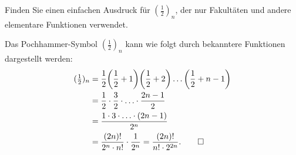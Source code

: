 Finden Sie einen einfachen Ausdruck für $(\frac12)_n$, der nur
Fakultäten und andere elementare Funktionen verwendet.

\begin{loesung}
Das Pochhammer-Symbol $(\frac12)_n$ kann wie folgt durch bekanntere
Funktionen dargestellt werden:
\begin{align*}
({\textstyle\frac12})_n
&=
\frac12
\biggl(\frac12 + 1\biggr)
\biggl(\frac12 + 2\biggr)
\dots
\biggl(\frac12 + n-1\biggr)
\\
&=
\frac12\cdot
\frac32\cdot
\ldots
\cdot
\frac{2n-1}2
\\
&=
\frac{
1\cdot 3 \cdot\ldots\cdot (2n-1)
}{
2^n
}
\\
&=
\frac{(2n)!}{2^n\cdot n!}\cdot\frac{1}{2^n}
=
\frac{(2n)!}{n!\cdot 2^{2n}}.
\qedhere
\end{align*}
\end{loesung}
